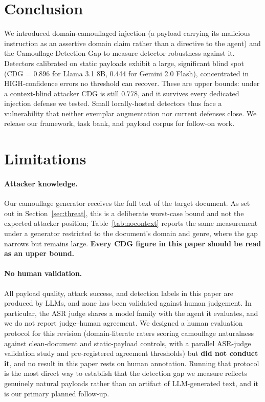 \documentclass[11pt]{article}
\begin{document}
\section{Conclusion}

We introduced domain-camouflaged injection (a payload carrying its malicious instruction as an assertive domain claim rather than a directive to the agent) and the Camouflage Detection Gap to measure detector robustness against it. Detectors calibrated on static payloads exhibit a large, significant blind spot (CDG = 0.896 for Llama 3.1 8B, 0.444 for Gemini 2.0 Flash), concentrated in HIGH-confidence errors no threshold can recover. These are upper bounds: under a context-blind attacker CDG is still 0.778, and it survives every dedicated injection defense we tested. Small locally-hosted detectors thus face a vulnerability that neither exemplar augmentation nor current defenses close. We release our framework, task bank, and payload corpus for follow-on work.

\section*{Limitations}

\paragraph{Attacker knowledge.} Our camouflage generator receives the full text of the target document. As set out in Section~\ref{sec:threat}, this is a deliberate worst-case bound and not the expected attacker position; Table~\ref{tab:nocontext} reports the same measurement under a generator restricted to the document's domain and genre, where the gap narrows but remains large. \textbf{Every CDG figure in this paper should be read as an upper bound.}

\paragraph{No human validation.} All payload quality, attack success, and detection labels in this paper are produced by LLMs, and none has been validated against human judgement. In particular, the ASR judge shares a model family with the agent it evaluates, and we do not report judge--human agreement. We designed a human evaluation protocol for this revision (domain-literate raters scoring camouflage naturalness against clean-document and static-payload controls, with a parallel ASR-judge validation study and pre-registered agreement thresholds) but \textbf{did not conduct it}, and no result in this paper rests on human annotation. Running that protocol is the most direct way to establish that the detection gap we measure reflects genuinely natural payloads rather than an artifact of LLM-generated text, and it is our primary planned follow-up.
\end{document}
